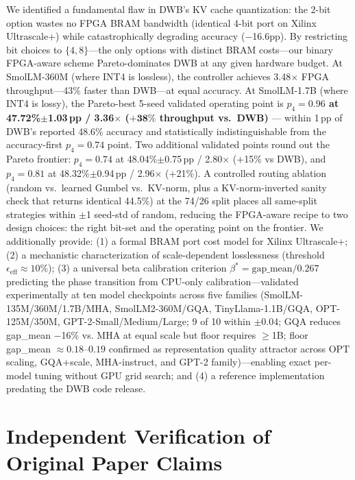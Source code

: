 \documentclass{article}
\begin{document}
We identified a fundamental flaw in DWB's KV cache quantization: the 2-bit option wastes no FPGA BRAM bandwidth (identical 4-bit port on Xilinx Ultrascale+) while catastrophically degrading accuracy ($-$16.6pp). By restricting bit choices to $\{4, 8\}$---the only options with distinct BRAM costs---our binary FPGA-aware scheme Pareto-dominates DWB at any given hardware budget. At SmolLM-360M (where INT4 is lossless), the controller achieves 3.48$\times$ FPGA throughput---43\% faster than DWB---at equal accuracy. At SmolLM-1.7B (where INT4 is lossy), the Pareto-best 5-seed validated operating point is \textbf{$p_4{=}0.96$ at 47.72\%$\pm$1.03\,pp / 3.36$\times$ ($\mathbf{+38\%}$ throughput vs.\ DWB)} --- within 1\,pp of DWB's reported 48.6\% accuracy and statistically indistinguishable from the accuracy-first $p_4{=}0.74$ point. Two additional validated points round out the Pareto frontier: $p_4{=}0.74$ at 48.04\%$\pm$0.75\,pp / 2.80$\times$ ($+$15\% vs DWB), and $p_4{=}0.81$ at 48.32\%$\pm$0.94\,pp / 2.96$\times$ ($+$21\%). A controlled routing ablation (random vs.\ learned Gumbel vs.\ KV-norm, plus a KV-norm-inverted sanity check that returns identical 44.5\%) at the 74/26 split places all same-split strategies within $\pm$1 seed-std of random, reducing the FPGA-aware recipe to two design choices: the right bit-set and the operating point on the frontier. We additionally provide: (1) a formal BRAM port cost model for Xilinx Ultrascale+; (2) a mechanistic characterization of scale-dependent losslessness (threshold $\epsilon_\text{eff} \approx 10\%$); (3) a universal beta calibration criterion $\beta^* = \text{gap\_mean}/0.267$ predicting the phase transition from CPU-only calibration---validated experimentally at ten model checkpoints across five families (SmolLM-135M/360M/1.7B/MHA, SmolLM2-360M/GQA, TinyLlama-1.1B/GQA, OPT-125M/350M, GPT-2-Small/Medium/Large; 9 of 10 within $\pm 0.04$; GQA reduces gap\_mean $-$16\% vs. MHA at equal scale but floor requires $\geq$1B; floor gap\_mean $\approx 0.18$--$0.19$ confirmed as representation quality attractor across OPT scaling, GQA+scale, MHA-instruct, and GPT-2 family)---enabling exact per-model tuning without GPU grid search; and (4) a reference implementation predating the DWB code release.

\appendix

\section{Independent Verification of Original Paper Claims}
\label{app:verification}
\end{document}
